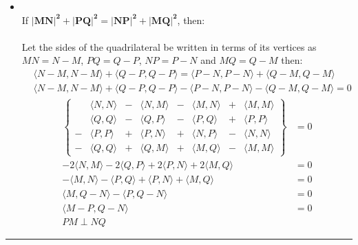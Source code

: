 \documentclass[12pt, letterpaper]{scrartcl}
\begin{document}
\begin{itemize}
\begin{align*}
        \right\}&=0 \quad \text{(re-arranging)}\\
        \left\{
        \begin{array}{cc}
        &\langle N-M, N-M\rangle\\
        +&\langle Q-P, Q-P\rangle\\
        -&\langle P-N, P-N\rangle\\
        -&\langle Q-M, Q-M\rangle
        \end{array}
        \right\}&=0%
    \end{align*}
    Thus:
    \begin{align*}
        \langle N-M, N-M\rangle+\langle Q-P, Q-P\rangle &= \langle P-N, P-N\rangle+\langle Q-M, Q-M\rangle\\
        |MN|^2+|PQ|^2&=|NP|^2+|MQ|^2
    \end{align*}
    
    \item[$\Longleftarrow$]\mbox{}\\If $\mathbf{|MN|^2+|PQ|^2=|NP|^2+|MQ|^2}$, then:\\\\
    Let the sides of the quadrilateral be written in terms of its vertices as $MN=N-M$, $PQ=Q-P$, $NP=P-N$ and $MQ=Q-M$ then:
    \begin{align*}
        &\langle N-M, N-M\rangle+\langle Q-P, Q-P\rangle = \langle P-N, P-N\rangle+\langle Q-M, Q-M\rangle\\
        &\langle N-M, N-M\rangle+\langle Q-P, Q-P\rangle - \langle P-N, P-N\rangle-\langle Q-M, Q-M\rangle = 0
    \end{align*}
    \begin{align*}
        \left\{
        \begin{array}{cccccccc}
        &\langle N,N\rangle&-&\langle N,M\rangle&-&\langle M,N\rangle&+&\langle M,M\rangle\\
        &\langle Q,Q\rangle&-&\langle Q,P\rangle&-&\langle P,Q\rangle&+&\langle P,P\rangle\\
        -&\langle P,P\rangle&+&\langle P,N\rangle&+&\langle N,P\rangle&-&\langle N,N\rangle\\
        -&\langle Q,Q\rangle&+&\langle Q,M\rangle&+&\langle M,Q\rangle&-&\langle M,M\rangle
        \end{array}
        \right\}&=0\\
        -2\langle N,M\rangle-2\langle Q,P\rangle+2\langle P,N\rangle+2\langle M,Q\rangle&=0\\
        -\langle M,N\rangle-\langle P,Q\rangle+\langle P,N\rangle+\langle M,Q\rangle&=0\\
        \langle M, Q-N\rangle - \langle P, Q-N\rangle&=0\\
        \langle M-P, Q-N\rangle&=0\\
        PM\perp NQ
    \end{align*}    
    
\end{itemize}
\vskip1mm\hrule
\end{document}
